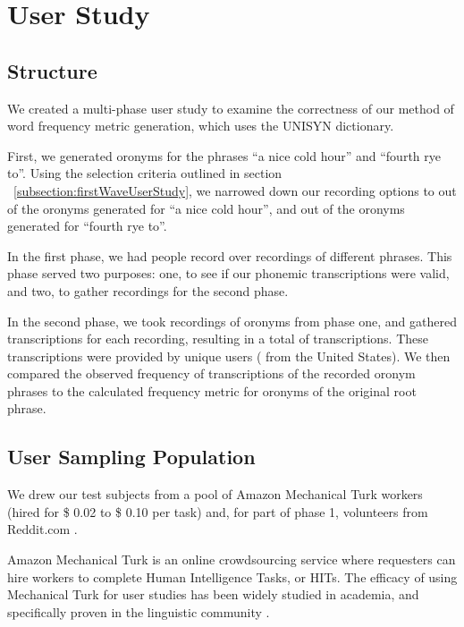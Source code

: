 \chapter{User Study}
\label{userStudy}

\section{Structure} We created a multi-phase user study to examine the correctness of our method of word frequency metric generation, which uses the UNISYN dictionary. 

First, we generated oronyms for the phrases ``a nice cold hour'' and ``fourth rye to''. Using the selection criteria outlined in section ~\ref{subsection:firstWaveUserStudy}, we narrowed down our recording options to \phaseOneANiceColdHourOronymsRecordedUnique out of the \aNiceColdHourOronymCount oronyms generated for ``a nice cold hour'', and \phaseOneFourthRyeToOronymsRecordedUnique out of the \forthRyeToOronymCount oronyms generated for ``fourth rye to''. 

In the first phase, we had \uniqueUsersPhaseOneUserStudy people record over \numResponsesPhaseOneUserStudy recordings of \phaseOneTotalOronymsRecordedUnique different phrases.  This phase served two purposes: one, to see if our phonemic transcriptions were valid, and two, to gather recordings for the second phase.  

In the second phase, we took \recordingsPhaseTwoUserStudy recordings of oronyms from phase one, and gathered \numTranscriptionsPerRecordingPhaseTwoUserStudy transcriptions for each recording, resulting in a total of \numResponsesPhaseTwoUserStudy transcriptions. These transcriptions were provided by \uniqueUsersPhaseTwoUserStudy unique users ( \uniqueUsersPhaseTwoUserStudyUSA from the United States).  We then compared the observed frequency of transcriptions of the recorded oronym phrases to the calculated frequency metric for oronyms of the original root phrase.

\section{User Sampling Population}
We drew our test subjects from a pool of Amazon Mechanical Turk workers (hired for \$ 0.02 to \$ 0.10 per task) and, for part of phase 1, volunteers from Reddit.com \cite{redditAssistance} \cite{redditRecordThis}. 

Amazon Mechanical Turk is an online crowdsourcing service where requesters can hire workers to complete Human Intelligence Tasks, or HITs.  The efficacy of using Mechanical Turk for user studies has been widely studied in academia, and specifically proven in the linguistic community \cite{sprouse_validation_2011}.

